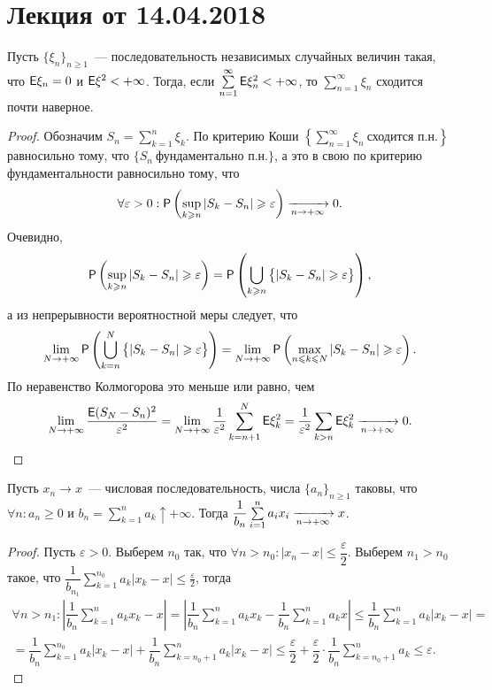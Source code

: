 \section{Лекция от 14.04.2018}
\begin{theorem}
	Пусть $\{\xi_n \}_{n \geqslant 1}$~--- последовательность независимых случайных величин такая, что $\E \xi_n = 0 $ и $\E \xi^2 < +\infty$. Тогда, если $\sum\limits_{n = 1}^{\infty} \E \xi_n^2 < +\infty$, то $ \sum\limits_{n = 1}^{\infty} \xi_n$ сходится почти наверное.
	\begin{proof}
		Обозначим $S_n = \sum\limits_{k=1}^n \xi_k$. По критерию Коши $\left\{ \sum\limits_{n = 1}^{\infty}\xi_n~\text{сходится п.н.} \right\}$ равносильно тому, что $\{ S_n~\text{фундаментально п.н.}\}$, а это в свою по критерию фундаментальности равносильно тому, что 
		$$\forall \varepsilon > 0: \P \left( \sup\limits_{k \geqslant n} | S_k - S_n | \geqslant \varepsilon \right) \limn 0.$$
		 Очевидно,
		 $$\P \left( \sup\limits_{k \geqslant n} | S_k - S_n | \geqslant \varepsilon \right) = \P \left( \bigcup\limits_{k \geqslant n} \big\{| S_k - S_n | \geqslant \varepsilon \big\} \right),$$
		 а из непрерывности вероятностной меры следует, что 
		 $$\lim\limits_{N \rightarrow +\infty} \P \left( \bigcup\limits_{k = n}^{N} \big\{| S_k - S_n | \geqslant \varepsilon \big\} \right) = \lim\limits_{N \rightarrow +\infty} \P \left( \max\limits_{n \leqslant k \leqslant N} | S_k - S_n | \geqslant \varepsilon \right).$$
		 По неравенство Колмогорова это меньше или равно, чем
		 $$\lim\limits_{N \rightarrow + \infty} \dfrac{\E ( S_N - S_n)^2}{\varepsilon^2} = \lim\limits_{N \rightarrow + \infty} \dfrac{1}{\varepsilon^2} \sum\limits_{k = n + 1}^N \E \xi_k^2 = \dfrac{1}{\varepsilon^2} \sum\limits_{k > n} \E \xi_k^2 \limn 0.$$
	\end{proof}
\end{theorem}
\begin{lemma}[Тёплица]
	Пусть $x_n \rightarrow x$~--- числовая последовательность, числа $\{a_n\}_{n \geqslant 1}$ таковы, что $ \forall n: a_n \geqslant 0$ и $ b_n = \sum\limits_{k = 1}^n a_k \uparrow +\infty$. Тогда $\dfrac{1}{b_n} \sum\limits_{i = 1}^n a_i x_i \limn x$.
	\begin{proof}
		Пусть $\varepsilon > 0$. Выберем $n_0$ так, что $\forall n > n_0: |x_n - x| \leqslant \dfrac{\varepsilon}{2}$. Выберем $n_1 > n_0$ такое, что $\dfrac{1}{b_{n_1}} \sum\limits_{k=1}^{n_0} a_k | x_k - x| \leqslant \frac{\varepsilon}{2}$, тогда
		\begin{multline*}
			\forall n > n_1: \left| \dfrac{1}{b_n} \sum\limits_{k = 1}^n a_k x_k - x \right| = \left| \dfrac{1}{b_n} \sum\limits_{k = 1}^n a_k x_k - \dfrac{1}{b_n} \sum\limits_{k = 1}^n a_k x \right| \leqslant \dfrac{1}{b_n} \sum\limits_{k = 1}^n a_k |x_k - x| = \\= \dfrac{1}{b_n} \sum\limits_{k = 1}^{n_0} a_k |x_k - x| + \dfrac{1}{b_n} \sum\limits_{k = n_0 + 1}^n a_k |x_k - x| \leqslant \dfrac{\varepsilon}{2} + \dfrac{\varepsilon}{2} \cdot \dfrac{1}{b_n} \sum\limits_{k = n_0 + 1}^n a_k \leqslant \varepsilon.
		\end{multline*}
	\end{proof}
\end{lemma}
